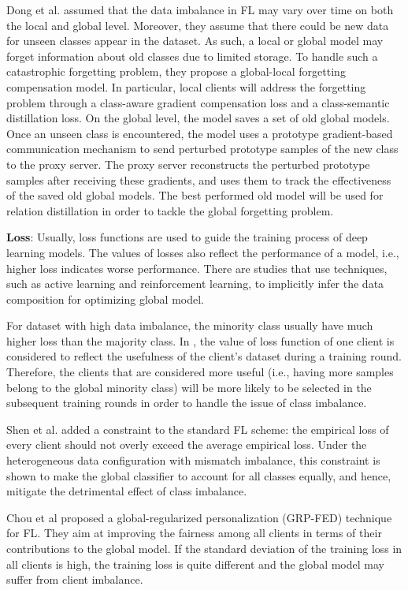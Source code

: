 \documentclass[10pt,journal,compsoc]{IEEEtran}
\begin{document}
Dong et al. \cite{dong2022federated} assumed that the data imbalance in FL may vary over time on both the local and global level. Moreover, they assume that there could be new data for unseen classes appear in the dataset. As such, a local or global model may forget information about old classes due to limited storage. To handle such a catastrophic forgetting problem, they propose a global-local forgetting compensation model. In particular, local clients will address the forgetting problem through a class-aware gradient compensation loss and a class-semantic distillation loss. On the global level, the model saves a set of old global models. Once an unseen class is encountered, the model uses a prototype gradient-based communication mechanism to send perturbed prototype samples of the new class to the proxy server. The proxy server reconstructs the perturbed prototype samples after receiving these gradients, and uses them to track the effectiveness of the saved old global models. The best performed old model will be used for relation distillation in order to tackle the global forgetting problem.

\textbf{Loss}: Usually, loss functions are used to guide the training process of deep learning models. The values of losses also reflect the performance of a model, i.e., higher loss indicates worse performance. There are studies that use techniques, such as active learning and reinforcement learning, to implicitly infer the data composition for optimizing global model. 


For dataset with high data imbalance, the minority class usually have much higher loss than the majority class. In \cite{goetz2019active}, the value of loss function of one client is considered to reflect the usefulness of the client's dataset during a training round. Therefore, the clients that are considered more useful (i.e., having more samples belong to the global minority class) will be more likely to be selected in the subsequent training rounds in order to handle the issue of class imbalance. 

Shen et al. \cite{shen2021agnostic} added a constraint to the standard FL scheme: the empirical loss of every client should not overly exceed the average empirical loss. Under the heterogeneous data configuration with mismatch imbalance, this constraint is shown to make the global classifier to account for all classes equally, and hence, mitigate the detrimental effect of class imbalance. 

Chou et al \cite{chou2022grp} proposed a global-regularized personalization (GRP-FED) technique for FL. They aim at improving the fairness among all clients in terms of their contributions to the global model. If the standard deviation of the training loss in all clients is high, the training loss is quite different and the global model may suffer from client imbalance. 
\end{document}
